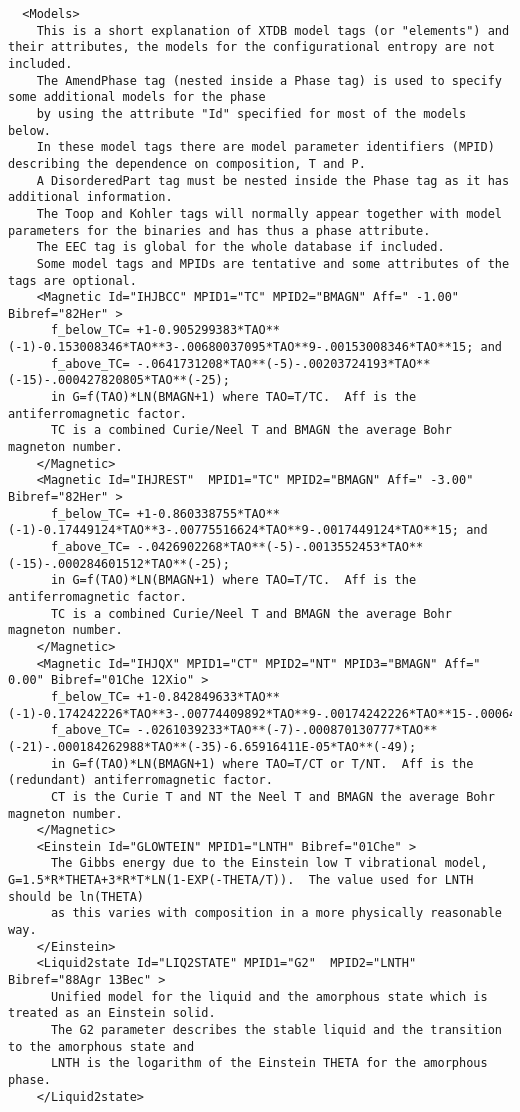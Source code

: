 \documentclass{article}
\begin{document}
\begin{appendices}
{\small
\begin{verbatim}
  <Models>
    This is a short explanation of XTDB model tags (or "elements") and their attributes, the models for the configurational entropy are not included.
    The AmendPhase tag (nested inside a Phase tag) is used to specify some additional models for the phase
    by using the attribute "Id" specified for most of the models below.
    In these model tags there are model parameter identifiers (MPID) describing the dependence on composition, T and P.
    A DisorderedPart tag must be nested inside the Phase tag as it has additional information.
    The Toop and Kohler tags will normally appear together with model parameters for the binaries and has thus a phase attribute.
    The EEC tag is global for the whole database if included.
    Some model tags and MPIDs are tentative and some attributes of the tags are optional.
    <Magnetic Id="IHJBCC" MPID1="TC" MPID2="BMAGN" Aff=" -1.00" Bibref="82Her" > 
      f_below_TC= +1-0.905299383*TAO**(-1)-0.153008346*TAO**3-.00680037095*TAO**9-.00153008346*TAO**15; and
      f_above_TC= -.0641731208*TAO**(-5)-.00203724193*TAO**(-15)-.000427820805*TAO**(-25); 
      in G=f(TAO)*LN(BMAGN+1) where TAO=T/TC.  Aff is the antiferromagnetic factor.
      TC is a combined Curie/Neel T and BMAGN the average Bohr magneton number.
    </Magnetic>
    <Magnetic Id="IHJREST"  MPID1="TC" MPID2="BMAGN" Aff=" -3.00" Bibref="82Her" > 
      f_below_TC= +1-0.860338755*TAO**(-1)-0.17449124*TAO**3-.00775516624*TAO**9-.0017449124*TAO**15; and 
      f_above_TC= -.0426902268*TAO**(-5)-.0013552453*TAO**(-15)-.000284601512*TAO**(-25); 
      in G=f(TAO)*LN(BMAGN+1) where TAO=T/TC.  Aff is the antiferromagnetic factor.
      TC is a combined Curie/Neel T and BMAGN the average Bohr magneton number.
    </Magnetic>
    <Magnetic Id="IHJQX" MPID1="CT" MPID2="NT" MPID3="BMAGN" Aff=" 0.00" Bibref="01Che 12Xio" > 
      f_below_TC= +1-0.842849633*TAO**(-1)-0.174242226*TAO**3-.00774409892*TAO**9-.00174242226*TAO**15-.000646538871*TAO**21;
      f_above_TC= -.0261039233*TAO**(-7)-.000870130777*TAO**(-21)-.000184262988*TAO**(-35)-6.65916411E-05*TAO**(-49);
      in G=f(TAO)*LN(BMAGN+1) where TAO=T/CT or T/NT.  Aff is the (redundant) antiferromagnetic factor.
      CT is the Curie T and NT the Neel T and BMAGN the average Bohr magneton number.
    </Magnetic>
    <Einstein Id="GLOWTEIN" MPID1="LNTH" Bibref="01Che" > 
      The Gibbs energy due to the Einstein low T vibrational model, G=1.5*R*THETA+3*R*T*LN(1-EXP(-THETA/T)).  The value used for LNTH should be ln(THETA)
      as this varies with composition in a more physically reasonable way.
    </Einstein>
    <Liquid2state Id="LIQ2STATE" MPID1="G2"  MPID2="LNTH" Bibref="88Agr 13Bec" > 
      Unified model for the liquid and the amorphous state which is treated as an Einstein solid.
      The G2 parameter describes the stable liquid and the transition to the amorphous state and
      LNTH is the logarithm of the Einstein THETA for the amorphous phase.
    </Liquid2state>
\end{verbatim}
}


\end{appendices}
\end{document}
